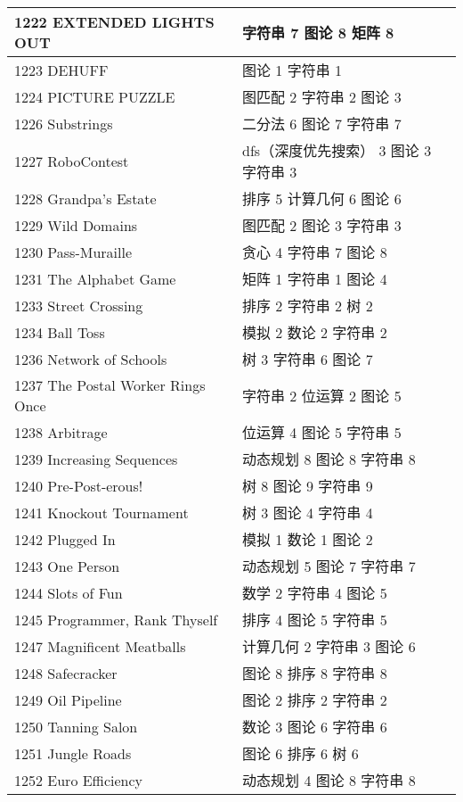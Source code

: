 \begin{longtable}{| p{} | p{} |}
 1222 EXTENDED LIGHTS OUT  & 字符串 7 图论 8 矩阵 8 \\ \hline
 1223 DEHUFF  & 图论 1 字符串 1 \\ \hline
 1224 PICTURE PUZZLE  & 图匹配 2 字符串 2 图论 3 \\ \hline
 1226 Substrings  & 二分法 6 图论 7 字符串 7 \\ \hline
 1227 RoboContest  & dfs（深度优先搜索） 3 图论 3 字符串 3 \\ \hline
 1228 Grandpa's Estate  & 排序 5 计算几何 6 图论 6 \\ \hline
 1229 Wild Domains  & 图匹配 2 图论 3 字符串 3 \\ \hline
 1230 Pass-Muraille  & 贪心 4 字符串 7 图论 8 \\ \hline
 1231 The Alphabet Game  & 矩阵 1 字符串 1 图论 4 \\ \hline
 1233 Street Crossing  & 排序 2 字符串 2 树 2 \\ \hline
 1234 Ball Toss  & 模拟 2 数论 2 字符串 2 \\ \hline
 1236 Network of Schools  & 树 3 字符串 6 图论 7 \\ \hline
 1237 The Postal Worker Rings Once  & 字符串 2 位运算 2 图论 5 \\ \hline
 1238 Arbitrage  & 位运算 4 图论 5 字符串 5 \\ \hline
 1239 Increasing Sequences  & 动态规划 8 图论 8 字符串 8 \\ \hline
 1240 Pre-Post-erous!  & 树 8 图论 9 字符串 9 \\ \hline
 1241 Knockout Tournament  & 树 3 图论 4 字符串 4 \\ \hline
 1242 Plugged In  & 模拟 1 数论 1 图论 2 \\ \hline
 1243 One Person  & 动态规划 5 图论 7 字符串 7 \\ \hline
 1244 Slots of Fun  & 数学 2 字符串 4 图论 5 \\ \hline
 1245 Programmer, Rank Thyself  & 排序 4 图论 5 字符串 5 \\ \hline
 1247 Magnificent Meatballs  & 计算几何 2 字符串 3 图论 6 \\ \hline
 1248 Safecracker  & 图论 8 排序 8 字符串 8 \\ \hline
 1249 Oil Pipeline  & 图论 2 排序 2 字符串 2 \\ \hline
 1250 Tanning Salon  & 数论 3 图论 6 字符串 6 \\ \hline
 1251 Jungle Roads  & 图论 6 排序 6 树 6 \\ \hline
 1252 Euro Efficiency  & 动态规划 4 图论 8 字符串 8 \\ \hline

\end{longtable}
